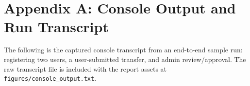 \section{Appendix A: Console Output and Run Transcript}
\label{appendix:console}

The following is the captured console transcript from an end-to-end sample run: registering two users, a user-submitted transfer, and admin review/approval. The raw transcript file is included with the report assets at \texttt{figures/console\_output.txt}.


